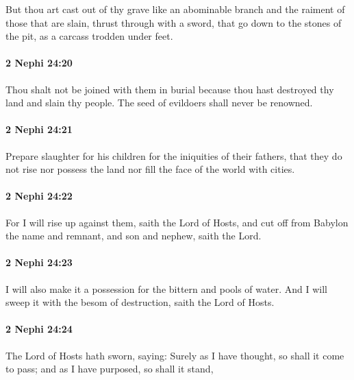 			But thou art cast out of thy grave
			like an abominable branch
			and the raiment of those that are slain,
			thrust through with a sword,
			that go down to the stones of the pit,
			as a carcass trodden under feet.

		\paragraph{2 Nephi 24:20} %
			\label{2NEPHI-24-20}

			Thou shalt not be joined with them in burial
			because thou hast destroyed thy land and slain thy people.
			The seed of evildoers shall never be renowned.

		\paragraph{2 Nephi 24:21} %
			\label{2NEPHI-24-21}

			Prepare slaughter for his children
			for the iniquities of their fathers,
			that they do not rise nor possess the land
			nor fill the face of the world with cities.

		\paragraph{2 Nephi 24:22} %
			\label{2NEPHI-24-22}

			For I will rise up against them, saith the Lord of Hosts,
			and cut off from Babylon the name and remnant,
			and son and nephew, saith the Lord.

		\paragraph{2 Nephi 24:23} %
			\label{2NEPHI-24-23}

			I will also make it a possession for the bittern and pools of water.
			And I will sweep it with the besom of destruction, saith the Lord of Hosts.

		\paragraph{2 Nephi 24:24} %
			\label{2NEPHI-24-24}

			The Lord of Hosts hath sworn, saying:
			Surely as I have thought, so shall it come to pass;
			and as I have purposed, so shall it stand,

